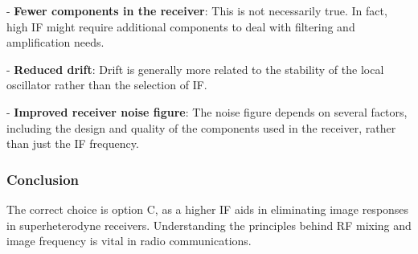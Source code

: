 - \textbf{Fewer components in the receiver}: This is not necessarily true. In fact, high IF might require additional components to deal with filtering and amplification needs.

- \textbf{Reduced drift}: Drift is generally more related to the stability of the local oscillator rather than the selection of IF.

- \textbf{Improved receiver noise figure}: The noise figure depends on several factors, including the design and quality of the components used in the receiver, rather than just the IF frequency.

\subsubsection{Conclusion}

The correct choice is option C, as a higher IF aids in eliminating image responses in superheterodyne receivers. Understanding the principles behind RF mixing and image frequency is vital in radio communications.





